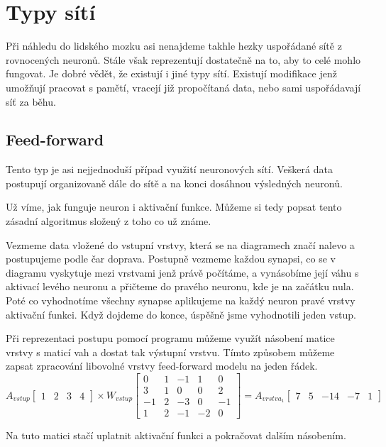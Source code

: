 \documentclass[12pt,a4paper]{report}
\begin{document}
	\section{Typy sítí}
	Při náhledu do lidského mozku asi nenajdeme takhle hezky uspořádané sítě z rovnocených neuronů. Stále však reprezentují dostatečně na to, aby to celé mohlo fungovat. Je dobré vědět, že existují i jiné typy sítí. Existují modifikace jenž umožňují pracovat s pamětí, vracejí již propočítaná data, nebo sami uspořádavají síť za běhu.
		\subsection{Feed-forward}
		Tento typ je asi nejjednoduší případ využití neuronových sítí. Veškerá data postupují organizovaně dále do sítě a na konci dosáhnou výsledných neuronů.
		
		Už víme, jak funguje neuron i aktivační funkce. Můžeme si tedy popsat tento zásadní algoritmus složený z toho co už známe.
		
		Vezmeme data vložené do vstupní vrstvy, která se na diagramech značí nalevo a postupujeme podle čar doprava. Postupně vezmeme každou synapsi, co se v diagramu vyskytuje mezi vrstvami jenž právě počítáme, a vynásobíme její váhu s aktivací levého neuronu a přičteme do pravého neuronu, kde je na začátku nula. Poté co vyhodnotíme všechny synapse aplikujeme na každý neuron pravé vrstvy aktivační funkci. Když dojdeme do konce, úspěšně jsme vyhodnotili jeden vstup.
		
		Při reprezentaci postupu pomocí programu můžeme využít násobení matice vrstvy s maticí vah a dostat tak výstupní vrstvu. Tímto způsobem můžeme zapsat zpracování libovolné vrstvy feed-forward modelu na jeden řádek.
		$$
		A_{vstup}
		\begin{bmatrix}
		1 & 2 & 3 & 4
		\end{bmatrix}
		\times
		W_{vstup}
		\begin{bmatrix}
		0  & 1 & -1 & 1  & 0  \\
		3  & 1 & 0  & 0  & 2  \\
		-1 & 2 & -3 & 0  & -1 \\
		1  & 2 & -1 & -2 & 0 
		\end{bmatrix}
		=
		A_{vrstva_1}
		\begin{bmatrix}
		7 & 5 & -14 & -7 & 1
		\end{bmatrix}
		$$
		
		Na tuto matici stačí uplatnit aktivační funkci a pokračovat dalším násobením.
		
\end{document}
